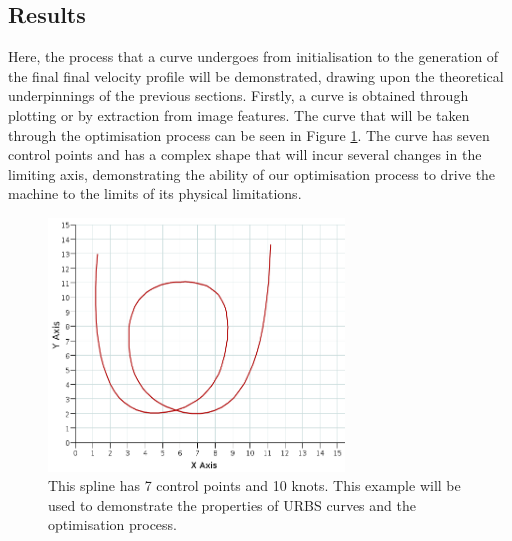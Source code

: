 \subsection{Results}
Here, the process that a curve undergoes from initialisation to the generation of the final final velocity profile will be demonstrated, drawing upon the theoretical underpinnings of the previous sections.
Firstly, a curve is obtained through plotting or by extraction from image features. The curve that will be taken through the optimisation process can be seen in Figure \ref{fig:example}. The curve has seven control points and has a complex shape that will incur several changes in the limiting axis, demonstrating the ability of our optimisation process to drive the machine to the limits of its physical limitations.

\begin{figure}[htbp]  
\includegraphics[width=0.7\textwidth]{figures/optimisation/exampleSpline.png}
\caption[Optimisation example curve]{ This spline has 7 control points and 10 knots. This example will be used to demonstrate the properties of URBS curves and the optimisation process.
\label{fig:example}}
\end{figure}
\clearpage

